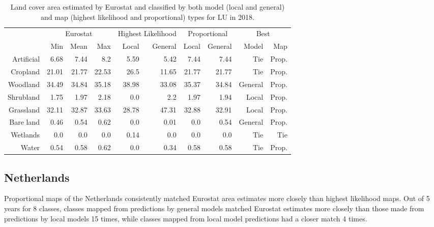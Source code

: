 \begin{table}[H]
\centering
\caption{Land cover area estimated by Eurostat and classified by both model (local and general) and map (highest likelihood and proportional) types for LU in 2018.}

\begin{tabular}{r|rrr|rr|rr|rr}
\toprule
{} & \multicolumn{3}{|c}{Eurostat} & \multicolumn{2}{|c}{Highest Likelihood} & \multicolumn{2}{|c}{Proportional} & \multicolumn{2}{|c}{Best} \\
{} &      Min &   Mean &    Max &              Local & General &        Local & General &    Model &    Map \\
\midrule
Artificial &     6.68 &   7.44 &    8.2 &               5.59 &    5.42 &         7.44 &    7.44 &      Tie &  Prop. \\
Cropland   &    21.01 &  21.77 &  22.53 &               26.5 &   11.65 &        21.77 &   21.77 &      Tie &  Prop. \\
Woodland   &    34.49 &  34.84 &  35.18 &              38.98 &   33.08 &        35.37 &   34.84 &  General &  Prop. \\
Shrubland  &     1.75 &   1.97 &   2.18 &                0.0 &     2.2 &         1.97 &    1.94 &    Local &  Prop. \\
Grassland  &    32.11 &  32.87 &  33.63 &              28.78 &   47.31 &        32.88 &   32.91 &    Local &  Prop. \\
Bare land  &     0.46 &   0.54 &   0.62 &                0.0 &    0.01 &          0.0 &    0.54 &  General &  Prop. \\
Wetlands   &      0.0 &    0.0 &    0.0 &               0.14 &     0.0 &          0.0 &     0.0 &      Tie &    Tie \\
Water      &     0.54 &   0.58 &   0.62 &                0.0 &    0.34 &         0.58 &    0.58 &      Tie &  Prop. \\
\bottomrule
\end{tabular}
\end{table}


\subsection{Netherlands}
Proportional maps of the Netherlands consistently matched Eurostat area estimates more closely than highest likelihood maps. Out of 5 years for 8 classes, classes mapped from predictions by general models matched Eurostat estimates more closely than those made from predictions by local models 15 times, while classes mapped from local model predictions had a closer match 4 times.

